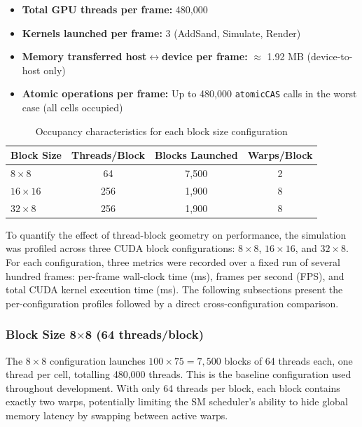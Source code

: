 \documentclass[12pt,a4paper]{article}
\begin{document}
    \begin{itemize}
        \item \textbf{Total GPU threads per frame:} 480,000
        \item \textbf{Kernels launched per frame:} 3 (AddSand, Simulate, Render)
        \item \textbf{Memory transferred host$\leftrightarrow$device per frame:} $\approx$ 1.92 MB (device-to-host only)
        \item \textbf{Atomic operations per frame:} Up to 480,000 \texttt{atomicCAS} calls in the worst case (all cells occupied)
    \end{itemize}

    \begin{table}[h]
    \centering
    \begin{tabular}{|l|c|c|c|}
    \hline
    \textbf{Block Size} & \textbf{Threads/Block} & \textbf{Blocks Launched} & \textbf{Warps/Block} \\
    \hline
    $8\times8$   & 64  & 7,500 & 2 \\
    $16\times16$ & 256 & 1,900 & 8 \\
    $32\times8$  & 256 & 1,900 & 8 \\
    \hline
    \end{tabular}
    \caption{Occupancy characteristics for each block size configuration}
    \label{Table:occupancy}
    \end{table}

    To quantify the effect of thread-block geometry on performance, the simulation was 
    profiled across three CUDA block configurations: $8\times8$, $16\times16$, and 
    $32\times8$. For each configuration, three metrics were recorded over a fixed run 
    of several hundred frames: per-frame wall-clock time (ms), frames per second (FPS), 
    and total CUDA kernel execution time (ms). The following subsections present the 
    per-configuration profiles followed by a direct cross-configuration comparison.

	\subsubsection{Block Size 8$\times$8 (64 threads/block)}

    The $8\times8$ configuration launches $100\times75 = 7{,}500$ blocks of 64 threads 
    each, one thread per cell, totalling 480,000 threads. This is the baseline configuration 
    used throughout development. With only 64 threads per block, each block contains exactly 
    two warps, potentially limiting the SM scheduler's ability to hide global memory 
    latency by swapping between active warps.
\end{document}
